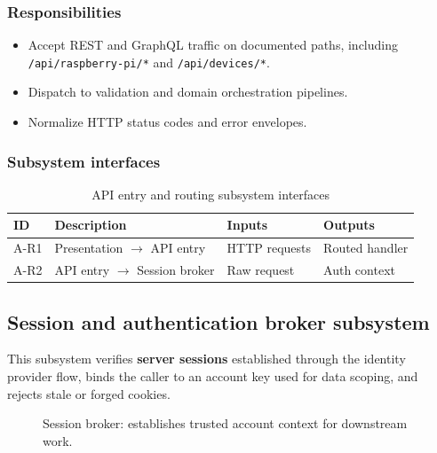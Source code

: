 \subsubsection{Responsibilities}
\begin{itemize}
  \item Accept REST and GraphQL traffic on documented paths, including \texttt{/api/raspberry-pi/*} and \texttt{/api/devices/*}.
  \item Dispatch to validation and domain orchestration pipelines.
  \item Normalize HTTP status codes and error envelopes.
\end{itemize}

\subsubsection{Subsystem interfaces}
\begin{table}[H]
\centering
\small
\begin{tabular}{|p{0.9cm}|p{3.4cm}|p{3.0cm}|p{3.5cm}|}
\hline
\textbf{ID} & \textbf{Description} & \textbf{Inputs} & \textbf{Outputs} \\
\hline
A-R1 & Presentation $\rightarrow$ API entry & HTTP requests & Routed handler \\
\hline
A-R2 & API entry $\rightarrow$ Session broker & Raw request & Auth context \\
\hline
\end{tabular}
\caption{API entry and routing subsystem interfaces}
\end{table}

\subsection{Session and authentication broker subsystem}

This subsystem verifies \textbf{server sessions} established through the identity provider flow, binds the caller to an account key used for data scoping, and rejects stale or forged cookies.

\begin{figure}[H]
\centering
{}
\caption{Session broker: establishes trusted account context for downstream work.}
\label{fig:app-session}
\end{figure}

